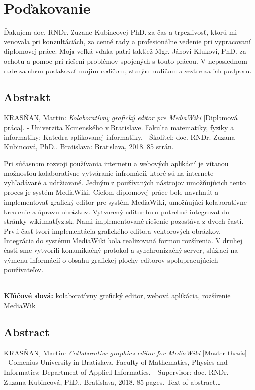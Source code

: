 \documentclass[12pt, a4paper, oneside]{book}
\newcommand\mftitle{Kolaboratívny grafický editor pre MediaWiki}
\newcommand\enmftitle{Collaborative graphics editor for MediaWiki}
\newcommand\mfthesistype{Diplomová práca}
\newcommand\enmfthesistype{Master thesis}
\newcommand\mfadvisor{doc. RNDr. Zuzana Kubincová, PhD.}
\newcommand\mfplacedate{Bratislava, 2018}
\newcommand\mfpracovisko{Katedra aplikovanej informatiky}
\newcommand\enmfpracovisko{Department of Applied Informatics}
\begin{document}
\chapter*{Poďakovanie}\label{chap:thank_you}
Ďakujem doc. RNDr. Zuzane Kubincovej PhD. za čas a trpezlivosť, ktorú mi venovala pri konzultáciách, za cenné rady a profesionálne vedenie pri vypracovaní diplomovej práce. Moja veľká vďaka patrí taktiež Mgr. Jánovi Kľukovi, PhD. za ochotu a pomoc pri riešení problémov spojených s touto prácou. V neposlednom rade sa chem poďakovať mojim rodičom, starým rodičom a sestre za ich podporu. 
\vfill\eject 

\def\spaceafterpar{1em}
\setlength{\parskip}{\spaceafterpar}
\setlength\parindent{0pt}

\section*{Abstrakt}\label{chap:abstract_sk}
\MakeUppercase{Krasňan}, Martin: \textit{\mftitle} [\mfthesistype]. - Univerzita Komenského v Bratislave. Fakulta matematiky, fyziky a informatiky; \mfpracovisko. - Školiteľ: \mfadvisor. Bratislava: \mfplacedate. 85 strán.

Pri súčasnom rozvoji používania internetu a webových aplikácií je vítanou možnosťou kolaboratívne vytváranie infromácií, ktoré sú na internete vyhľadávané a udržiavané. Jedným z používaných nástrojov umožňujúcich tento proces je systém MediaWiki.
Cieľom diplomovej práce bolo navrhnúť a implementovať grafický editor pre systém MediaWiki, umožňujúci kolaboratívne kreslenie a úpravu obrázkov. Vytvorený editor bolo potrebné integrovať do stránky wiki.matfyz.sk. Nami implementované riešenie pozostáva z dvoch častí. Prvú časť tvorí implementácia grafického editora vektorových obrázkov. Integrácia do systému MediaWiki bola realizovaná formou rozšírenia. V druhej časti sme vytvorili komunikačný protokol a synchronizačný server, slúžiaci na výmenu informácií o obsahu grafickej plochy editorov spolupracujúcich používateľov. 

~\\
\textbf{Kľúčové slová:} kolaboratívny grafický editor, webová aplikácia, rozšírenie MediaWiki
\vfill\eject 

\section*{Abstract}\label{chap:abstract_en}
\MakeUppercase{Krasňan}, Martin: \textit{\enmftitle} [\enmfthesistype]. - Comenius University in Bratislava. Faculty of Mathematics, Physics and Informatics; \enmfpracovisko. - Supervisor: \mfadvisor. \mfplacedate. 85 pages.
Text of abstract...
\end{document}
